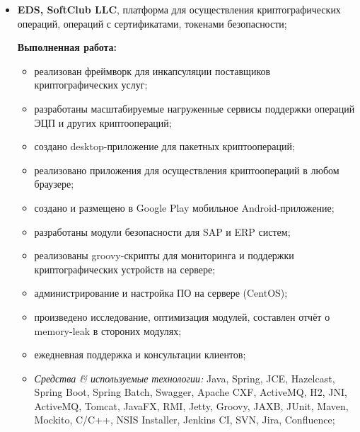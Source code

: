 \documentclass[a4paper, 12pt]{article}
\newcommand{\position}[1]{
    \textbf{#1}}
\newcommand{\itemlabel}[1]{
    \textit{#1:}}
\begin{document}
    \begin{itemize}
        \item \position{EDS, SoftClub LLC}, платформа для осуществления криптографических операций, операций с сертификатами, токенами безопасности;

            \textbf{Выполненная работа:}
			\begin{itemize}
  				\item реализован фреймворк для инкапсуляции поставщиков криптографических услуг;
  				\item разработаны масштабируемые нагруженные сервисы поддержки операций ЭЦП и других криптоопераций;
				\item создано desktop-приложение для пакетных криптоопераций;
  				\item реализовано приложения для осуществления криптоопераций в любом браузере;
  				\item создано и размещено в Google Play мобильное Android-приложение;
  				\item разработаны модули безопасности для SAP и ERP систем;
  				\item реализованы groovy-скрипты для мониторинга и поддержки криптографических устройств на сервере;
  				\item администрирование и настройка ПО на сервере (CentOS);
  				\item произведено исследование, оптимизация модулей, составлен отчёт о memory-leak в стороних модулях;
  				\item ежедневная поддержка и консультации клиентов;
			\end{itemize}
	
            \begin{itemize}
                \item \itemlabel{Средства \& используемые технологии} Java, Spring, JCE, Hazelcast, Spring Boot, Spring Batch, Swagger, Apache CXF, ActiveMQ, H2, JNI, ActiveMQ, Tomcat, JavaFX, RMI, Jetty, Groovy, JAXB, JUnit, Maven, Mockito, C/C++, NSIS Installer, Jenkins CI, SVN, Jira, Confluence;
            \end{itemize}
    \end{itemize}  
             
\end{document}
